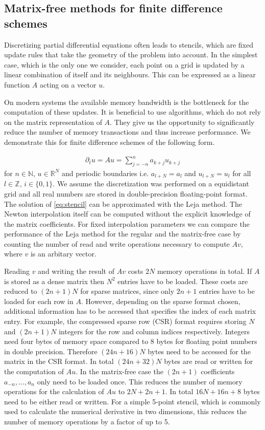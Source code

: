 \documentclass{scrartcl}
\begin{document}
\subsection{Matrix-free methods for finite difference schemes} \label{sec:FDS}
	Discretizing partial differential equations often leads to stencils, which are fixed update rules that take the geometry of the problem into account. In the simplest case, which is the only one we consider, each point on a grid is updated by a linear combination of itself and its neighbours. This can be expressed as a linear function $A$ acting on a vector $u$. 


	On modern systems the available memory bandwidth is the bottleneck for the computation of these updates. It is beneficial to use algorithms, which do not rely on the matrix representation of $A$. They give us the opportunity to significantly reduce the number of memory transactions and thus increase performance. We demonstrate this for finite difference schemes of the following form.

	\begin{align}
		\partial_{t}u = Au = \sum_{j=-n}^{n} a_{k+j}u_{k+j} \label{eq:stencil}
	\end{align}
	for $n\in\mathbb{N}$, $u\in\mathbb{R}^N$ and periodic boundaries i.e. $a_{l+N} = a_{l}$ and $u_{l+N}=u_{l}$ for all $l\in\mathbb{Z}$, $i\in\{0,1\}$.
	We assume the discretization was performed on a equidistant grid and all real numbers are stored in double-precision floating-point format.
	The solution of \eqref{eq:stencil} can be approximated with the Leja method. The Newton interpolation itself can be computed without the explicit knowledge of the matrix coefficients. For fixed interpolation parameters we can compare the performance of the Leja method for the regular and the matrix-free case by counting the number of read and write operations necessary to compute $Av$, where $v$ is an arbitary vector.


	Reading $v$ and writing the result of $Av$ costs $2N$ memory operations in total. If $A$ is stored as a dense matrix then $N^2$ entries have to be loaded. These costs are reduced to $(2n+1)N$ for sparse matrices, since only $2n+1$ entries have to be loaded for each row in $A$. However, depending on the sparse format chosen, additional information has to be accessed that specifies the index of each matrix entry. For example, the compressed sparse row (CSR) format requires storing $N$ and $(2n+1)N$ integers for the row and column indices respectively. Integers need four bytes of memory space compared to 8 bytes for floating point numbers in double precision. Therefore $(24n + 16)N$ bytes need to be accessed for the matrix in the CSR format. In total $(24n + 32)N$ bytes are read or written for the computation of $Au$.
	In the matrix-free case the $(2n+1)$ coefficients $a_{-n}, \dots, a_{n}$ only need to be loaded once. This reduces the number of memory operations for the calculation of $Au$ to $2N + 2n + 1$. In total $16N + 16n + 8$ bytes need to be either read or written. For a simple 5-point stencil, which is commonly used to calculate the numerical derivative in two dimensions, this reduces the number of memory operations by a factor of up to 5.
	
\end{document}
